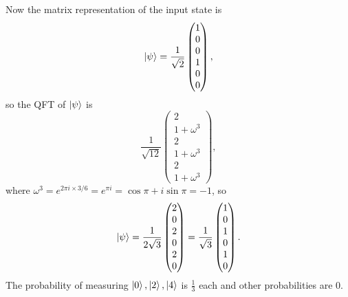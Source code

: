 \documentclass[10pt]{article}
\begin{document}
Now the matrix representation of the input state is
\[
\ket{\psi} = \frac{1}{\sqrt{2}} 
\begin{pmatrix}
1 \\ 0 \\ 0 \\ 1 \\ 0 \\ 0
\end{pmatrix},
\]
so the QFT of $\ket{\psi}$ is
\[
\frac{1}{\sqrt{12}}
\begin{pmatrix}
2 \\ 
1  + \omega^{3} \\
2 \\
1 + \omega^{3} \\
2 \\
1 + \omega^{3}
\end{pmatrix},
\]
where $\omega^{3} = e^{2\pi i \times 3 / 6} = e^{\pi i} = \cos \pi + i \sin \pi = -1$, so
\[
\ket{\psi} = \frac{1}{2\sqrt{3}}
\begin{pmatrix}
2 \\ 0 \\2 \\ 0 \\2 \\ 0 
\end{pmatrix} = 
\frac{1}{\sqrt{3}}
\begin{pmatrix}
1 \\ 0 \\ 1 \\ 0 \\ 1 \\ 0 
\end{pmatrix}.
\]
The probability of measuring $\ket{0}, \ket{2}, \ket{4}$ is $\frac{1}{3}$ each and other probabilities are 0.
\end{document}
